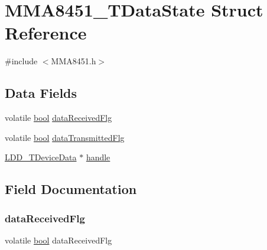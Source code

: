\hypertarget{struct_m_m_a8451___t_data_state}{}\section{M\+M\+A8451\+\_\+\+T\+Data\+State Struct Reference}
\label{struct_m_m_a8451___t_data_state}


{\ttfamily \#include $<$M\+M\+A8451.\+h$>$}

\subsection*{Data Fields}
\begin{DoxyCompactItemize}
\item 
volatile \hyperlink{group___p_e___types__module_ga97a80ca1602ebf2303258971a2c938e2}{bool} \hyperlink{struct_m_m_a8451___t_data_state_a3ddd3de0c4ca1cc35c093d0fafa9aacc}{data\+Received\+Flg}
\item 
volatile \hyperlink{group___p_e___types__module_ga97a80ca1602ebf2303258971a2c938e2}{bool} \hyperlink{struct_m_m_a8451___t_data_state_ae4a5b3535d88284e222fdf98493d4627}{data\+Transmitted\+Flg}
\item 
\hyperlink{group___p_e___types__module_gac5cf1362f1f0e3a2ce71b1bf2276d091}{L\+D\+D\+\_\+\+T\+Device\+Data} $\ast$ \hyperlink{struct_m_m_a8451___t_data_state_aaee7757e46c8f9489a453e1a3a7319e8}{handle}
\end{DoxyCompactItemize}


\subsection{Field Documentation}
\mbox{\label{struct_m_m_a8451___t_data_state_a3ddd3de0c4ca1cc35c093d0fafa9aacc}} 
\subsubsection{\texorpdfstring{data\+Received\+Flg}{dataReceivedFlg}}
{\footnotesize\ttfamily volatile \hyperlink{group___p_e___types__module_ga97a80ca1602ebf2303258971a2c938e2}{bool} data\+Received\+Flg}

\mbox{\label{struct_m_m_a8451___t_data_state_ae4a5b3535d88284e222fdf98493d4627}} 
